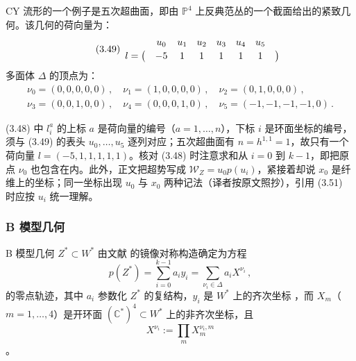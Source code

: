 CY 流形的一个例子是五次超曲面，即由 $\mathbb{P}^4$ 上反典范丛的一个截面给出的紧致几何。该几何的荷向量为：
\begin{equation}\tag{3.49}
\begin{array}{c@{\quad}c@{\quad}c@{\quad}c@{\quad}c@{\quad}c@{\quad}c@{\quad}c}
 & u_0 & u_1 & u_2 & u_3 & u_4 & u_5 & \\[2pt]
l=\big( & -5 & 1 & 1 & 1 & 1 & 1 & \big)
\end{array}
\end{equation}
多面体 $\Delta$ 的顶点为：
\begin{equation}\tag{3.50}
\begin{array}{l}
\nu_0=(0,0,0,0,0)\,,\quad \nu_1=(1,0,0,0,0)\,,\quad \nu_2=(0,1,0,0,0)\,,\\[2pt]
\nu_3=(0,0,1,0,0)\,,\quad \nu_4=(0,0,0,1,0)\,,\quad \nu_5=(-1,-1,-1,-1,0)\,.
\end{array}
\end{equation}

\begin{yizhu}[易错点]
(3.48) 中 $l_i^a$ 的上标 $a$ 是荷向量的编号（$a=1,\dots,n$），下标 $i$ 是环面坐标的编号，须与 (3.49) 的表头 $u_0,\dots,u_5$ 逐列对应；五次超曲面有 $n=h^{1,1}=1$，故只有一个荷向量 $l=(-5,1,1,1,1,1)$。核对 (3.48) 时注意求和从 $i=0$ 到 $k-1$，即把原点 $\nu_0$ 也包含在内。此外，正文把超势写成 $\mathcal{W}_Z=u_0p(u_i)$，紧接着却说 $x_0$ 是纤维上的坐标；同一坐标出现 $u_0$ 与 $x_0$ 两种记法（译者按原文照抄），引用 (3.51) 时应按 $u_i$ 统一理解。
\end{yizhu}

\subsubsection{B 模型几何}
\label{sec:3.6.2}

B 模型几何 $Z^*\subset W^*$ 由文献 \cite{ref67,ref65} 的镜像对称构造确定为方程
\begin{equation}\tag{3.51}
p(Z^*)=\sum_{i=0}^{k-1}a_iy_i=\sum_{\nu_i\in\Delta}a_iX^{\nu_i}\,,
\end{equation}
的零点轨迹，其中 $a_i$ 参数化 $Z^*$ 的复结构，$y_i$ 是 $W^*$ 上的齐次坐标 \cite{ref67}，而 $X_m$（$m=1,\dots,4$）是开环面 $(\mathbb{C}^*)^4\subset W^*$ 上的非齐次坐标，且
\[
X^{\nu_i}:=\prod_mX_m^{\nu_i,m}
\]
\cite{ref46}。


